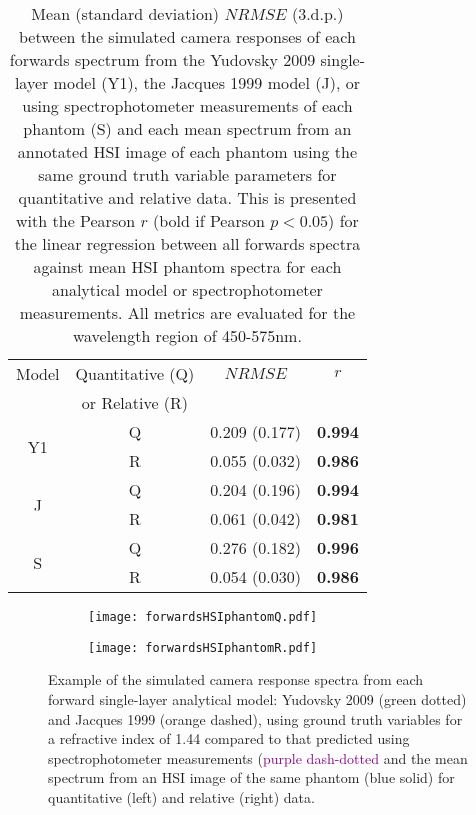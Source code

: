 \begin{table}[h!] %
    \centering
    \caption{Mean (standard deviation) $NRMSE$ (3.d.p.) between the simulated camera responses of each forwards spectrum from the Yudovsky 2009 single-layer model (Y1), the Jacques 1999 model (J), or using spectrophotometer measurements of each phantom (S) and each mean spectrum from an annotated HSI image of each phantom using the same ground truth variable parameters for quantitative and relative data. This is presented with the Pearson $r$ (bold if Pearson $p < 0.05$) for the linear regression between all forwards spectra against mean HSI phantom spectra for each analytical model or spectrophotometer measurements. All metrics are evaluated for the wavelength region of 450-575nm.}
    \begin{tabular}{|c|c|cc|}
        \hline
        Model & Quantitative (Q) & $NRMSE$ & $r$ \\
         & or Relative (R) &  & \\
        \hline
        \multirow{2}{*}{Y1} & Q & 0.209 (0.177) & \textbf{0.994} \\
        & R & 0.055 (0.032) & \textbf{0.986} \\ %
        \hline
        \multirow{2}{*}{J} & Q & 0.204 (0.196) & \textbf{0.994} \\
        & R & 0.061 (0.042) & \textbf{0.981} \\
        \hline
        \multirow{2}{*}{S} & Q & 0.276 (0.182) & \textbf{0.996} \\
         & R & 0.054 (0.030) & \textbf{0.986} \\
        \hline
    \end{tabular}
    \label{tb:forwardsHSIphantoms}
\end{table}

\begin{figure}[h!]
    \centering
    \begin{subfigure}{0.49\textwidth}
        \texttt{[image: forwardsHSIphantomQ.pdf]}
        \caption{}
        \label{fig:egforwardsHSIQ}
    \end{subfigure}
    \begin{subfigure}{0.49\textwidth}
        \texttt{[image: forwardsHSIphantomR.pdf]}
        \caption{}
        \label{fig:egforwardsHSIR}
    \end{subfigure}
    \caption{Example of the simulated camera response spectra from each forward single-layer analytical model: Yudovsky 2009 (\textcolor{MyGreen}{green dotted}) and Jacques 1999 (\textcolor{MyOrange}{orange dashed}), using ground truth variables for a refractive index of 1.44 compared to that predicted using spectrophotometer measurements (\textcolor{purple}{purple dash-dotted} and the mean spectrum from an HSI image of the same phantom (\textcolor{MyBlue}{blue solid}) for quantitative (left) and relative (right) data.}
    \label{fig:forwardsHSIphantoms}
\end{figure}

